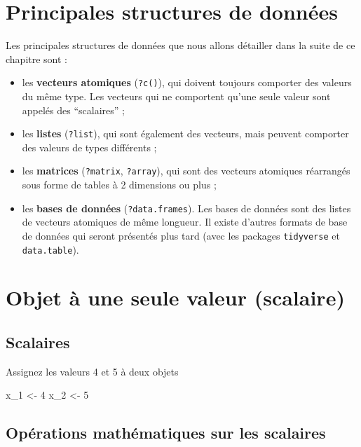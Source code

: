 \documentclass[
]{book}
\newenvironment{Shaded}{\begin{snugshade}}{\end{snugshade}}
\newcommand{\DecValTok}[1]{\textcolor[rgb]{0.00,0.00,0.81}{#1}}
\newcommand{\NormalTok}[1]{#1}
\newcommand{\OtherTok}[1]{\textcolor[rgb]{0.56,0.35,0.01}{#1}}
\providecommand{\tightlist}{%
  \setlength{\itemsep}{0pt}\setlength{\parskip}{0pt}}
\begin{document}
\section{Principales structures de données}\label{principales-structures-de-donnuxe9es}

Les principales structures de données que nous allons détailler dans la suite de ce chapitre sont :

\begin{itemize}
\tightlist
\item
  les \textbf{vecteurs atomiques} (\texttt{?c()}), qui doivent toujours comporter des valeurs du même type. Les vecteurs qui ne comportent qu'une seule valeur sont appelés des ``scalaires'' ;
\item
  les \textbf{listes} (\texttt{?list}), qui sont également des vecteurs, mais peuvent comporter des valeurs de types différents ;
\item
  les \textbf{matrices} (\texttt{?matrix}, \texttt{?array}), qui sont des vecteurs atomiques réarrangés sous forme de tables à 2 dimensions ou plus ;
\item
  les \textbf{bases de données} (\texttt{?data.frames}). Les bases de données sont des listes de vecteurs atomiques de même longueur. Il existe d'autres formats de base de données qui seront présentés plus tard (avec les packages \texttt{tidyverse} et \texttt{data.table}).
\end{itemize}

\section{Objet à une seule valeur (scalaire)}\label{objet-uxe0-une-seule-valeur-scalaire}

\subsection{Scalaires}\label{scalaires}

Assignez les valeurs 4 et 5 à deux objets

\begin{Shaded}
\begin{Highlighting}[]
\NormalTok{x\_1 }\OtherTok{\textless{}{-}} \DecValTok{4}
\NormalTok{x\_2 }\OtherTok{\textless{}{-}} \DecValTok{5}
\end{Highlighting}
\end{Shaded}

\subsection{Opérations mathématiques sur les scalaires}\label{opuxe9rations-mathuxe9matiques-sur-les-scalaires}
\end{document}
